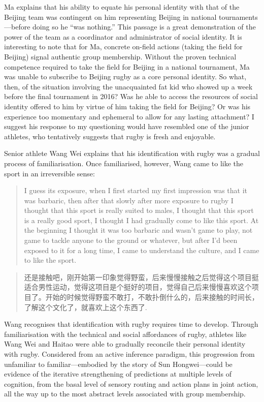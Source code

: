 \begin{CJK}{UTF8}{gbsn}
Ma explains that his ability to equate his personal identity with that of the Beijing team was contingent on him representing Beijing in national tournaments---before doing so he ``was nothing.''  This passage is a great demonstration of the power of the team as a coordinator and administrator of social identity.  It is interesting to note that for Ma, concrete on-field actions (taking the field for Beijing) signal authentic group membership.  Without the proven technical competence required to take the field for Beijing in a national tournament, Ma was unable to subscribe to Beijing rugby as a core personal identity.  So what, then, of the situation involving the unacquainted fat kid who showed up a week before the final tournament in 2016?  Was he able to access the resources of social identity offered to him by virtue of him taking the field for Beijing? Or was his experience too momentary and ephemeral to allow for any lasting attachment?  I suggest his response to my questioning would have resembled one of the junior athletes, who tentatively suggests that rugby is fresh and enjoyable.

Senior athlete Wang Wei explains that his identification with rugby was a gradual process of familiarisation. Once familiarised, however, Wang came to like the sport in an irreversible sense:

  \begin{quote}
    I guess its exposure, when I first started my first impression was that it was barbaric, then after that slowly after more exposure to rugby I thought that this sport is really suited to males, I thought that this sport is a really good sport, I thought I had gradually come to like this sport.  At the beginning I thought it was too barbaric and wasn’t game to play, not game to tackle anyone to the ground or whatever, but after I’d been exposed to it for a long time, I came to understand the culture, and I came to like the sport.
  \end{quote}

  \begin{quote}
    还是接触吧，刚开始第一印象觉得野蛮，后来慢慢接触之后觉得这个项目挺适合男性运动，觉得这项目是个挺好的项目，觉得自己后来慢慢喜欢这个项目了。开始的时候觉得野蛮不敢打，不敢扑倒什么的，后来接触的时间长，了解这个文化了，就喜欢上这个东西了.
  \end{quote}

Wang recognises that identification with rugby requires time to develop. Through familiarisation with the technical and social affordances of rugby, athletes like Wang Wei and Haitao were able to gradually reconcile their personal identity with rugby.  Considered from an active inference paradigm, this progression from unfamiliar to familiar---embodied by the story of Sun Hongwei---could be evidence of the iterative strengthening of predictions at multiple levels of cognition, from the basal level of sensory routing and action plans in joint action, all the way up to the most abstract levels associated with group membership.




\end{CJK}
